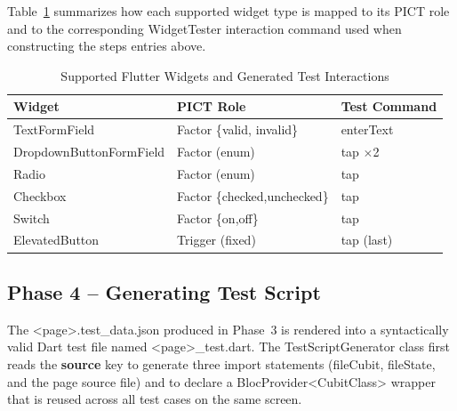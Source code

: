 \documentclass[conference]{IEEEtran}
\renewcommand{\texttt}[1]{\textnormal{#1}}
\begin{document}
Table~\ref{tab:widgets} summarizes how each supported widget type is
mapped to its PICT role and to the corresponding \texttt{WidgetTester}
interaction command used when constructing the \texttt{steps} entries
above.

\begin{table}[!t]
  \caption{Supported Flutter Widgets and Generated Test Interactions}
  \label{tab:widgets}
  \centering
  \footnotesize
  \renewcommand{\arraystretch}{1.3}
  \begin{tabular}{p{2.9cm}p{2.3cm}p{1.8cm}}
    \toprule
    \textbf{Widget} & \textbf{PICT Role} & \textbf{Test Command} \\
    \midrule
    \texttt{TextFormField}           & Factor \{\texttt{valid}, \texttt{invalid}\} & \texttt{enterText} \\
    \texttt{DropdownButton}\newline\texttt{FormField} & Factor (enum) & \texttt{tap} $\times$2 \\
    \texttt{Radio}                   & Factor (enum)     & \texttt{tap} \\
    \texttt{Checkbox}                & Factor \{checked,unchecked\} & \texttt{tap} \\
    \texttt{Switch}                  & Factor \{on,off\} & \texttt{tap} \\
    \texttt{ElevatedButton}          & Trigger (fixed)   & \texttt{tap} (last) \\
    \bottomrule
  \end{tabular}
\end{table}

\subsection{Phase 4 -- Generating Test Script}

The \texttt{<page>.test\_\allowbreak{}data.json} produced in Phase~3 is rendered
into a syntactically valid Dart test file named
\texttt{<page>\_\allowbreak{}test.dart}. The \texttt{TestScriptGenerator} class
first reads the \textbf{source} key to generate three \texttt{import}
statements (\texttt{fileCubit}, \texttt{fileState}, and the page
source file) and to declare a
\texttt{BlocProvider\allowbreak{}\textless CubitClass\textgreater} wrapper that is
reused across all test cases on the same screen.
\end{document}
